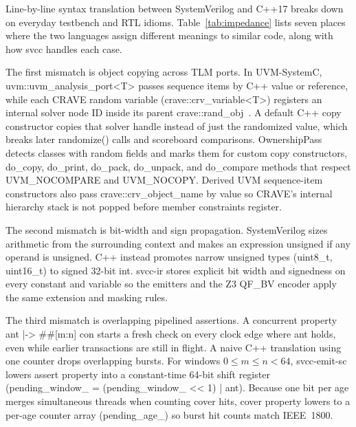 \documentclass[conference]{IEEEtran}
\newcommand{\code}[1]{{\fontshape{n}\ttfamily #1}}
\begin{document}
Line-by-line syntax translation between SystemVerilog and C++17 breaks down on everyday testbench and RTL idioms. Table~\ref{tab:impedance} lists seven places where the two languages assign different meanings to similar code, along with how \code{svcc} handles each case.

The first mismatch is object copying across TLM ports. In UVM-SystemC, \code{uvm::\allowbreak uvm\_\allowbreak analysis\_\allowbreak port<T>} passes sequence items by C++ value or reference, while each CRAVE random variable (\code{crave::\allowbreak crv\_\allowbreak variable<T>}) registers an internal solver node ID inside its parent \code{crave::\allowbreak rand\_obj}~\cite{haedicke2012crave}. A default C++ copy constructor copies that solver handle instead of just the randomized value, which breaks later \code{randomize()} calls and scoreboard comparisons. \code{OwnershipPass} detects classes with random fields and marks them for custom copy constructors, \code{do\_copy}, \code{do\_print}, \code{do\_pack}, \code{do\_unpack}, and \code{do\_compare} methods that respect \code{UVM\_NOCOMPARE} and \code{UVM\_NOCOPY}. Derived UVM sequence-item constructors also pass \code{crave::\allowbreak crv\_\allowbreak object\_\allowbreak name} by value so CRAVE's internal hierarchy stack is not popped before member constraints register.

The second mismatch is bit-width and sign propagation. SystemVerilog sizes arithmetic from the surrounding context and makes an expression unsigned if any operand is unsigned. C++ instead promotes narrow unsigned types (\code{uint8\_t}, \code{uint16\_t}) to signed 32-bit \code{int}. \code{svcc-ir} stores explicit bit width and signedness on every constant and variable so the emitters and the Z3 \code{QF\_BV} encoder apply the same extension and masking rules.

The third mismatch is overlapping pipelined assertions. A concurrent property \code{ant |-> \#\#[m:n] con} starts a fresh check on every clock edge where \code{ant} holds, even while earlier transactions are still in flight. A naive C++ translation using one counter drops overlapping bursts. For windows $0 \le m \le n < 64$, \code{svcc-emit-sc} lowers \code{assert property} into a constant-time 64-bit shift register (\code{pending\_window\_ = (pending\_window\_ <\kern0pt< 1) | ant}). Because one bit per age merges simultaneous threads when counting cover hits, \code{cover property} lowers to a per-age counter array (\code{pending\_age\_}) so burst hit counts match IEEE~1800.
\end{document}
